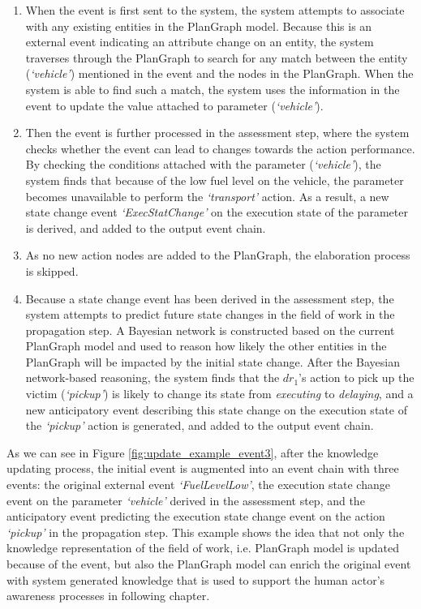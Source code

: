 \begin{enumerate}
	\item When the event is first sent to the system, the system attempts to associate with any existing entities in the PlanGraph model. Because this is an external event indicating an attribute change on an entity, the system traverses through the PlanGraph to search for any match between the entity (\emph{`vehicle'}) mentioned in the event and the nodes in the PlanGraph. When the system is able to find such a match, the system uses the information in the event to update the value attached to parameter (\emph{`vehicle'}).
	\item Then the event is further processed in the assessment step, where the system checks whether the event can lead to changes towards the action performance. By checking the conditions attached with the parameter (\emph{`vehicle'}), the system finds that because of the low fuel level on the vehicle, the parameter becomes unavailable to perform the \emph{`transport'} action. As a result, a new state change event \emph{`ExecStatChange'} on the execution state of the parameter is derived, and added to the output event chain.
	\item As no new action nodes are added to the PlanGraph, the elaboration process is skipped.
	\item Because a state change event has been derived in the assessment step, the system attempts to predict future state changes in the field of work in the propagation step. A Bayesian network is constructed based on the current PlanGraph model and used to reason how likely the other entities in the PlanGraph will be impacted by the initial state change. After the Bayesian network-based reasoning, the system finds that the $dr_1$'s action to pick up the victim (\emph{`pickup'}) is likely to change its state from \emph{executing} to \emph{delaying}, and a new anticipatory event describing this state change on the execution state of the \emph{`pickup'} action is generated, and added to the output event chain.
\end{enumerate}

As we can see in Figure \ref{fig:update_example_event3}, after the knowledge updating process, the initial event is augmented into an event chain with three events: the original external event \emph{`FuelLevelLow'}, the execution state change event on the parameter \emph{`vehicle'} derived in the assessment step, and the anticipatory event predicting the execution state change event on the action \emph{`pickup'} in the propagation step. This example shows the idea that not only the knowledge representation of the field of work, i.e. PlanGraph model is updated because of the event, but also the PlanGraph model can enrich the original event with system generated knowledge that is used to support the human actor's awareness processes in following chapter.

